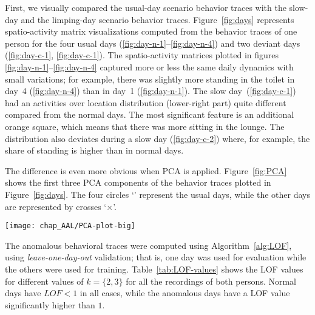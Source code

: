 First, we visually compared the usual-day scenario behavior traces with the slow-day and the limping-day scenario behavior traces. Figure~\ref{fig:days} represents spatio-activity matrix visualizations computed from the behavior traces of one person for the four usual days (\ref{fig:day-n-1}--\ref{fig:day-n-4}) and two deviant days (\ref{fig:day-c-1}, \ref{fig:day-c-1}). The spatio-activity matrices plotted in figures \ref{fig:day-n-1}--\ref{fig:day-n-4} captured more or less the same daily dynamics with small variations; for example, there was slightly more standing in the toilet in day~4 (\ref{fig:day-n-4}) than in day~1 (\ref{fig:day-n-1}). The slow day~(\ref{fig:day-c-1}) had an activities over location distribution (lower-right part) quite different compared from the normal days. The most significant feature is an additional orange square, which means that there was more sitting in the lounge. The distribution also deviates during a slow day (\ref{fig:day-c-2}) where, for example, the share of standing is higher than in normal days. 

The difference is even more obvious when PCA is applied. Figure~\ref{fig:PCA} shows the first three PCA components of the behavior traces plotted in Figure~\ref{fig:days}. The four circles `\textbullet' represent the usual days, while the other days are represented by crosses `$\times $'.

\begin{figure*}[t]
\centering
\texttt{[image: chap\_AAL/PCA-plot-big]}
\caption{Visualization of principal components computed from the matrices shown in Figure~\ref{fig:days}. Normal days are presented with circles, deviation days with  crosses.}
\label{fig:PCA}
\end{figure*}

The anomalous behavioral traces were computed using Algorithm~\ref{alg:LOF}, using {\it leave-one-day-out} validation; that is, one day was used for evaluation while the others were used for training. Table~\ref{tab:LOF-values} shows the LOF values for different values of $k=\{2,3\}$ for all the recordings of both persons. Normal days have $LOF < 1$ in all cases, while the anomalous days have a LOF value significantly higher than $1$.


